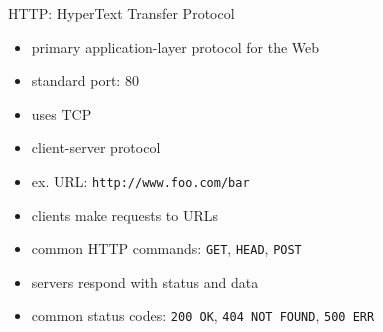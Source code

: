 \begin{frame}[fragile]{HTTP: HyperText Transfer Protocol}
\begin{itemize}
    \item primary application-layer protocol for the Web
    \item standard port: 80
    \item uses TCP
    \item client-server protocol
\end{itemize}
\begin{itemize}
    \item ex. URL: \texttt{http://www.foo.com/bar}
\end{itemize}
\begin{itemize}
    \item clients make requests to URLs
    \item common HTTP commands: \texttt{GET}, \texttt{HEAD}, \texttt{POST}
    \item servers respond with status and data
    \item common status codes: \texttt{200 OK}, \texttt{404 NOT FOUND}, \texttt{500 ERR}
\end{itemize}
\end{frame}